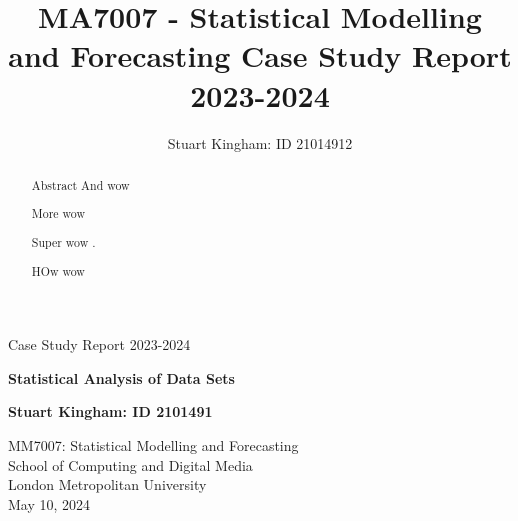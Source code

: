 \documentclass{article}
\title{MA7007 - Statistical Modelling and Forecasting Case Study Report 2023-2024}
\author{Stuart Kingham: ID 21014912}
\begin{document}
\doublespacing



\begin{titlepage}
  \vspace*{\fill}
  \begin{center}
       \vspace*{1cm}

       {\LARGE Case Study Report 2023-2024}

       \vspace*{1cm}
       {\large \textbf{Statistical Analysis of Data Sets}}
       

       \vfill

       \textbf{Stuart Kingham: ID 2101491}

       \vfill
                        
       \vspace{0.8cm}
     

       MM7007: Statistical Modelling and Forecasting\\
       School of Computing and Digital Media\\
       London Metropolitan University\\
       May 10, 2024
            
  \end{center}
  \vspace*{\fill}
\end{titlepage}

\pagebreak

\begin{abstract}
  Abstract And wow \cite{Rigby:2019}

  More wow \autocite{Fredriks:2000}

  Super wow \textcite{Cohen:2010}.

  HOw wow 
\end{abstract}

\newpage
\end{document}
